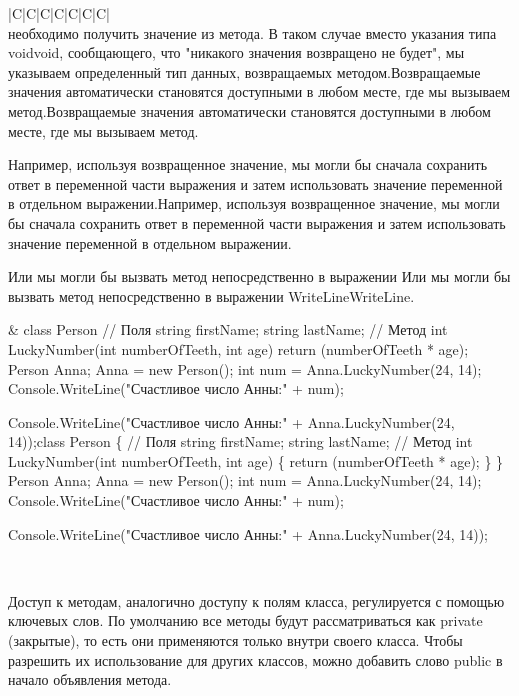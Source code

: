 \documentclass[12pt, a4paper]{article}
\begin{document}
\begin{table}[!ht] \setlength\extrarowheight{2pt} \begin{tabularx}{\textwidth}{|C|C|C|C|C|C|C|} \hline{}\\  необходимо получить значение из метода. В таком случае вместо указания типа voidvoid, сообщающего, что "никакого значения возвращено не будет", мы указываем определенный тип данных, возвращаемых методом.Возвращаемые значения автоматически становятся доступными в любом месте, где мы вызываем метод.Возвращаемые значения автоматически становятся доступными в любом месте, где мы вызываем метод.

Например, используя возвращенное значение, мы могли бы сначала сохранить ответ в переменной части выражения и затем использовать значение переменной в отдельном выражении.Например, используя возвращенное значение, мы могли бы сначала сохранить ответ в переменной части выражения и затем использовать значение переменной в отдельном выражении.

Или мы могли бы вызвать метод непосредственно в выражении Или мы могли бы вызвать метод непосредственно в выражении WriteLineWriteLine.

&
class Person
{
  // Поля
  string firstName;
  string lastName;
  // Метод
  int LuckyNumber(int numberOfTeeth,
  int age)
  {
  return (numberOfTeeth * age);
  }
}
Person Anna;
Anna = new Person();
int num = Anna.LuckyNumber(24, 14);
Console.WriteLine("Счастливое число
Анны:" + num);


Console.WriteLine("Счастливое число
Анны:" + Anna.LuckyNumber(24, 14));class Person
\{
  // Поля
  string firstName;
  string lastName;
  // Метод
  int LuckyNumber(int numberOfTeeth,
  int age)
  \{
  return (numberOfTeeth * age);
  \}
\}
Person Anna;
Anna = new Person();
int num = Anna.LuckyNumber(24, 14);
Console.WriteLine("Счастливое число
Анны:" + num);


Console.WriteLine("Счастливое число
Анны:" + Anna.LuckyNumber(24, 14));

\\ \hline\end{tabularx}         \end{table}


Доступ к методам, аналогично доступу к полям класса, регулируется с помощью ключевых слов. По умолчанию все методы будут рассматриваться как private  (закрытые), то есть они применяются только внутри своего класса. Чтобы разрешить их использование для других классов, можно добавить слово public  в начало объявления метода.\\
\end{document}
